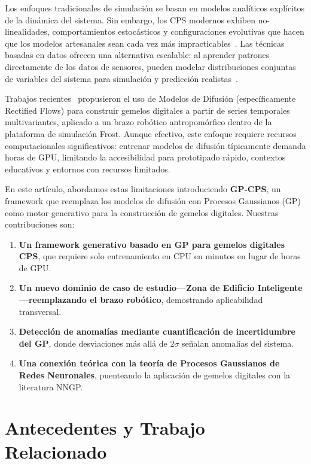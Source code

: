 \documentclass[conference]{IEEEtran}
\begin{document}
Los enfoques tradicionales de simulación se basan en modelos analíticos explícitos de la dinámica del sistema. Sin embargo, los CPS modernos exhiben no-linealidades, comportamientos estocásticos y configuraciones evolutivas que hacen que los modelos artesanales sean cada vez más impracticables~\cite{yaacoub2020}. Las técnicas basadas en datos ofrecen una alternativa escalable: al aprender patrones directamente de los datos de sensores, pueden modelar distribuciones conjuntas de variables del sistema para simulación y predicción realistas~\cite{yuan2019}.

Trabajos recientes~\cite{turco2025} propusieron el uso de Modelos de Difusión (específicamente Rectified Flows) para construir gemelos digitales a partir de series temporales multivariantes, aplicado a un brazo robótico antropomórfico dentro de la plataforma de simulación Frost. Aunque efectivo, este enfoque requiere recursos computacionales significativos: entrenar modelos de difusión típicamente demanda horas de GPU, limitando la accesibilidad para prototipado rápido, contextos educativos y entornos con recursos limitados.

En este artículo, abordamos estas limitaciones introduciendo \textbf{GP-CPS}, un framework que reemplaza los modelos de difusión con Procesos Gaussianos (GP) como motor generativo para la construcción de gemelos digitales. Nuestras contribuciones son:

\begin{enumerate}
\item \textbf{Un framework generativo basado en GP para gemelos digitales CPS}, que requiere solo entrenamiento en CPU en minutos en lugar de horas de GPU.
\item \textbf{Un nuevo dominio de caso de estudio---Zona de Edificio Inteligente---reemplazando el brazo robótico}, demostrando aplicabilidad transversal.
\item \textbf{Detección de anomalías mediante cuantificación de incertidumbre del GP}, donde desviaciones más allá de $2\sigma$ señalan anomalías del sistema.
\item \textbf{Una conexión teórica con la teoría de Procesos Gaussianos de Redes Neuronales}, puenteando la aplicación de gemelos digitales con la literatura NNGP.
\end{enumerate}

\section{Antecedentes y Trabajo Relacionado}
\label{sec:antecedentes}
\end{document}
